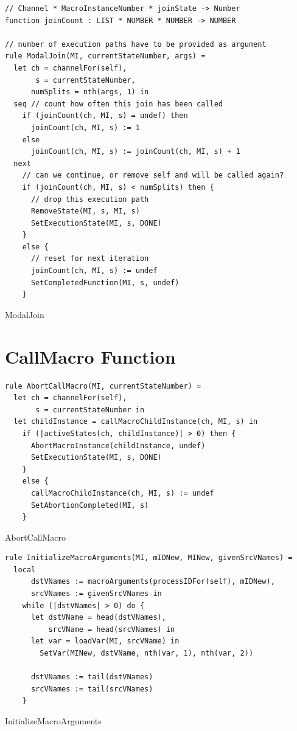 \begin{listing}[H]
\begin{verbatim}
// Channel * MacroInstanceNumber * joinState -> Number
function joinCount : LIST * NUMBER * NUMBER -> NUMBER

// number of execution paths have to be provided as argument
rule ModalJoin(MI, currentStateNumber, args) =
  let ch = channelFor(self),
       s = currentStateNumber,
      numSplits = nth(args, 1) in
  seq // count how often this join has been called
    if (joinCount(ch, MI, s) = undef) then
      joinCount(ch, MI, s) := 1
    else
      joinCount(ch, MI, s) := joinCount(ch, MI, s) + 1
  next
    // can we continue, or remove self and will be called again?
    if (joinCount(ch, MI, s) < numSplits) then {
      // drop this execution path
      RemoveState(MI, s, MI, s)
      SetExecutionState(MI, s, DONE)
    }
    else {
      // reset for next iteration
      joinCount(ch, MI, s) := undef
      SetCompletedFunction(MI, s, undef)
    }
\end{verbatim}
\caption{ModalJoin}
\label{lst:asm:ModalJoin}
\end{listing}


\section{CallMacro Function}


\begin{listing}[H]
\begin{verbatim}
rule AbortCallMacro(MI, currentStateNumber) =
  let ch = channelFor(self),
       s = currentStateNumber in
  let childInstance = callMacroChildInstance(ch, MI, s) in
    if (|activeStates(ch, childInstance)| > 0) then {
      AbortMacroInstance(childInstance, undef)
      SetExecutionState(MI, s, DONE)
    }
    else {
      callMacroChildInstance(ch, MI, s) := undef
      SetAbortionCompleted(MI, s)
    }
\end{verbatim}
\caption{AbortCallMacro}
\label{lst:asm:AbortCallMacro}
\end{listing}




\begin{listing}[H]
\begin{verbatim}
rule InitializeMacroArguments(MI, mIDNew, MINew, givenSrcVNames) =
  local
      dstVNames := macroArguments(processIDFor(self), mIDNew),
      srcVNames := givenSrcVNames in
    while (|dstVNames| > 0) do {
      let dstVName = head(dstVNames),
          srcVName = head(srcVNames) in
      let var = loadVar(MI, srcVName) in
        SetVar(MINew, dstVName, nth(var, 1), nth(var, 2))

      dstVNames := tail(dstVNames)
      srcVNames := tail(srcVNames)
    }
\end{verbatim}
\caption{InitializeMacroArguments}
\label{lst:asm:InitializeMacroArguments}
\end{listing}




